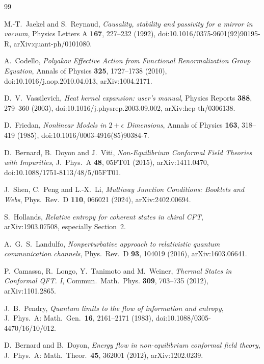 \begin{thebibliography}{99}

M.-T.~Jaekel and S.~Reynaud, \emph{Causality, stability and passivity
for a mirror in vacuum}, Physics Letters A \textbf{167}, 227--232
(1992), doi:10.1016/0375-9601(92)90195-R,
arXiv:quant-ph/0101080.

A.~Codello, \emph{Polyakov Effective Action from Functional
Renormalization Group Equation}, Annals of Physics \textbf{325},
1727--1738 (2010), doi:10.1016/j.aop.2010.04.013,
arXiv:1004.2171.

D.~V.~Vassilevich, \emph{Heat kernel expansion: user's manual},
Physics Reports \textbf{388}, 279--360 (2003),
doi:10.1016/j.physrep.2003.09.002, arXiv:hep-th/0306138.

D.~Friedan, \emph{Nonlinear Models in $2+\epsilon$ Dimensions},
Annals of Physics \textbf{163}, 318--419 (1985),
doi:10.1016/0003-4916(85)90384-7.

D.~Bernard, B.~Doyon and J.~Viti,
\emph{Non-Equilibrium Conformal Field Theories with Impurities},
J.~Phys.~A \textbf{48}, 05FT01 (2015), arXiv:1411.0470,
doi:10.1088/1751-8113/48/5/05FT01.

J.~Shen, C.~Peng and L.-X.~Li, \emph{Multiway Junction Conditions:
Booklets and Webs}, Phys.\ Rev.\ D \textbf{110}, 066021 (2024),
arXiv:2402.00694.

S.~Hollands, \emph{Relative entropy for coherent states in chiral CFT},
arXiv:1903.07508, especially Section~2.

A.~G.~S.~Landulfo, \emph{Nonperturbative approach to relativistic quantum communication channels},
Phys.\ Rev.\ D \textbf{93}, 104019 (2016), arXiv:1603.06641.

P.~Camassa, R.~Longo, Y.~Tanimoto and M.~Weiner,
\emph{Thermal States in Conformal QFT. I}, Commun.\ Math.\ Phys.
\textbf{309}, 703--735 (2012), arXiv:1101.2865.

J.~B.~Pendry, \emph{Quantum limits to the flow of information and entropy},
J.\ Phys.\ A: Math.\ Gen.\ \textbf{16}, 2161--2171 (1983),
doi:10.1088/0305-4470/16/10/012.

D.~Bernard and B.~Doyon, \emph{Energy flow in non-equilibrium conformal field theory},
J.\ Phys.\ A: Math.\ Theor.\ \textbf{45}, 362001 (2012), arXiv:1202.0239.


\end{thebibliography}
